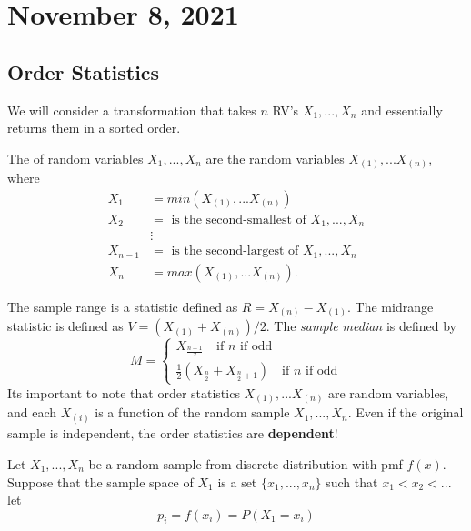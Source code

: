 \section{November 8, 2021}
\subsection{Order Statistics}
We will consider a transformation that takes  $n$ RV's $X_1,...,X_n$ and essentially returns them in a sorted order. 
\begin{definition}
The  of random variables $X_1,...,X_n$ are the random variables $X_{(1)},...X_{(n)}$, where
\begin{align*}
X_{1} & = min(X_{(1)},...X_{(n)})\\
X_{2} & = \text{ is the second-smallest of } X_1,...,X_n \\
& \vdots \\
X_{n-1} & = \text{ is the second-largest of } X_1,...,X_n \\
X_{n} & = max(X_{(1)},...X_{(n)}).
\end{align*}
\end{definition}
The sample range is a statistic defined as $R = X_{(n)} - X_{(1)}$. The midrange statistic is defined as $V = (X_{(1)} + X_{(n)})/2$. The \textit{sample median} is defined by
$$
M = 
\begin{cases}
    X_{\frac{n+1}{2}} \quad \text{if } n \text{ if odd} \\
   \frac{1}{2}(X_{\frac{n}{2}} + X_{\frac{n}{2} + 1} ) \quad \text{if } n \text{ if odd}
\end{cases}
$$
Its important to note that order statistics $X_{(1)},...X_{(n)}$ are random variables, and each $X_{(i)}$ is a function of the random sample $X_1,...,X_n$. Even if the original sample is independent, the order statistics are \textbf{dependent}! 
\begin{theorem}
Let $X_1,...,X_n$ be a random sample from discrete distribution with pmf $f(x)$. Suppose that the sample space of $X_1$ is a set $\{x_1,...,x_n \}$ such that $x_1 < x_2 < ...$ let
$$
p_i = f(x_i) = P(X_1 = x_i)
$$
\end{theorem}